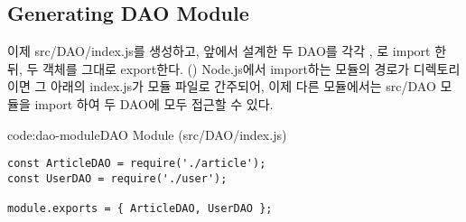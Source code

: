 \subsection*{Generating DAO Module}

이제 src/DAO/index.js를 생성하고, 앞에서 설계한 두 DAO를 각각 , 로 import 한 뒤, 두 객체를 그대로 export한다. () Node.js에서 import하는 모듈의 경로가 디렉토리이면 그 아래의 index.js가 모듈 파일로 간주되어, 이제 다른 모듈에서는 src/DAO 모듈을 import 하여 두 DAO에 모두 접근할 수 있다.

\begin{codeenv}{code:dao-module}{DAO Module (src/DAO/index.js)}\begin{verbatim}
const ArticleDAO = require('./article');
const UserDAO = require('./user');

module.exports = { ArticleDAO, UserDAO };
\end{verbatim}
\end{codeenv}
